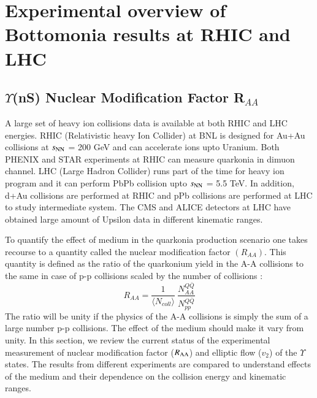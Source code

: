 \section{Experimental overview of Bottomonia results at RHIC and LHC}



\subsection{$\Upsilon$(nS) Nuclear Modification Factor R$_{AA}$}
A large set of heavy ion collisions data is available at both RHIC and LHC energies.
RHIC (Relativistic heavy Ion Collider) at BNL is designed for Au+Au collisions
at $s_{\rm NN}$ = 200 GeV and can accelerate ions upto Uranium. Both PHENIX and
STAR experiments at RHIC can measure quarkonia in dimuon channel. 
LHC (Large Hadron Collider) runs part of the time for heavy ion program and it
can perform PbPb collision upto $s_{\rm NN}$ = 5.5 TeV. In addition, d+Au collisions
are performed at RHIC and pPb collisions are performed at LHC to study
intermediate system. The CMS and ALICE detectors at LHC have obtained large
amount of Upsilon data in different kinematic ranges.

To quantify the effect of medium in the quarkonia production scenario one takes
recourse to a quantity called the nuclear modification factor $(R_{AA})$. This quantity
is defined as the ratio of the quarkonium yield in the A-A collisions to the same
in case of p-p collisions scaled by the number of collisions : 
 \begin{equation}
 R_{AA} = \frac{1}{\langle N_{coll} \rangle} \ \frac {N^{Q{\bar Q}}_{AA}} {N^{Q{\bar Q}}_{pp}} 
 \end{equation}
 The ratio will be unity if the physics of the A-A collisions is simply the sum of a large number 
 p-p collisions. The effect of the medium should make it vary from unity. 
In this section, we review the current status of the experimental measurement
of nuclear modification factor ($R_{\rm AA}$) and elliptic flow ($v_{2}$) of the
$\Upsilon$ states. The results from different experiments are compared to
understand effects of the medium and their dependence on the collision energy
and kinematic ranges. 




